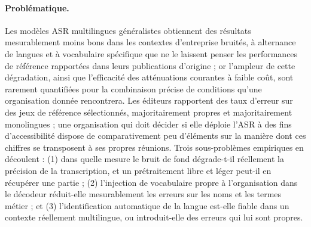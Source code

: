 \documentclass[12pt]{report}
\begin{document}
\paragraph{Problématique.}
Les modèles ASR multilingues généralistes obtiennent des résultats mesurablement moins bons dans les contextes d'entreprise bruités, à alternance de langues et à vocabulaire spécifique que ne le laissent penser les performances de référence rapportées dans leurs publications d'origine ; or l'ampleur de cette dégradation, ainsi que l'efficacité des atténuations courantes à faible coût, sont rarement quantifiées pour la combinaison précise de conditions qu'une organisation donnée rencontrera. Les éditeurs rapportent des taux d'erreur sur des jeux de référence sélectionnés, majoritairement propres et majoritairement monolingues ; une organisation qui doit décider si elle déploie l'ASR à des fins d'accessibilité dispose de comparativement peu d'éléments sur la manière dont ces chiffres se transposent à ses propres réunions. Trois sous-problèmes empiriques en découlent : (1) dans quelle mesure le bruit de fond dégrade-t-il réellement la précision de la transcription, et un prétraitement libre et léger peut-il en récupérer une partie ; (2) l'injection de vocabulaire propre à l'organisation dans le décodeur réduit-elle mesurablement les erreurs sur les noms et les termes métier ; et (3) l'identification automatique de la langue est-elle fiable dans un contexte réellement multilingue, ou introduit-elle des erreurs qui lui sont propres.
\end{document}

